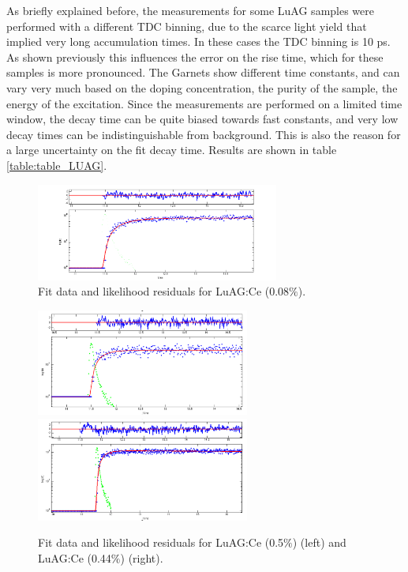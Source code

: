 As briefly explained before, the measurements for some LuAG samples were performed with a different TDC binning, due to the scarce light yield that implied very long accumulation times. In these cases the TDC binning is 10 ps. As shown previously this influences the error on the rise time, which for these samples is more pronounced.
The Garnets show different time constants, and can vary very much based on the doping concentration, the purity of the sample, the energy of the excitation. Since the measurements are performed on a limited time window, the decay time can be quite biased towards fast constants, and very low decay times can be indistinguishable from background. This is also the reason for a large uncertainty on the fit decay time.
Results are shown in table \ref{table:table_LUAG}.
\begin{figure}[htbp]
\begin{center}
\includegraphics[width=8cm]{../Pictures/Chapter_7/luag_0_0_8.png}
\end{center}
\caption[LuAG:Ce (0.08$\%$) profile]{Fit data and likelihood residuals for LuAG:Ce (0.08$\%$).}
\label{fig:luag_1}
\end{figure}

\begin{figure}[htbp]
\begin{center}
\includegraphics[width=7cm]{../Pictures/Chapter_7/2612.png}
\includegraphics[width=7cm]{../Pictures/Chapter_7/0_44.png}
\end{center}
\caption[LuAG:Ce (0.5$\%$) and LuAG:Ce (0.44$\%$) profile]{Fit data and likelihood residuals for LuAG:Ce (0.5$\%$) (left) and LuAG:Ce (0.44$\%$) (right).}
\label{fig:luag_2}
\end{figure}

